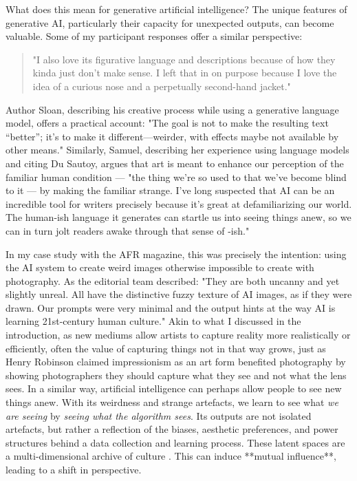 What does this mean for generative artificial intelligence? The unique features of generative AI, particularly their capacity for unexpected outputs, can become valuable. Some of my participant responses offer a similar perspective:

\begin{quote}
"I also love its figurative language and descriptions because of how they kinda just don't make sense. I left that in on purpose because I love the idea of a curious nose and a perpetually second-hand jacket."
\end{quote}

Author Sloan, describing his creative process while using a generative language model, offers a practical account: "The goal is not to make the resulting text “better”; it’s to make it different—weirder, with effects maybe not available by other means." Similarly, Samuel, describing her experience using language models and citing Du Sautoy, argues that art is meant to enhance our perception of the familiar human condition — "the thing we’re so used to that we’ve become blind to it — by making the familiar strange. I’ve long suspected that AI can be an incredible tool for writers precisely because it’s great at defamiliarizing our world. The human-ish language it generates can startle us into seeing things anew, so we can in turn jolt readers awake through that sense of -ish."

In my case study with the AFR magazine, this was precisely the intention: using the AI system to create weird images otherwise impossible to create with photography. As the editorial team described: "They are both uncanny and yet slightly unreal. All have the distinctive fuzzy texture of AI images, as if they were drawn. Our prompts were very minimal and the output hints at the way AI is learning 21st-century human culture." Akin to what I discussed in the introduction, as new mediums allow artists to capture reality more realistically or efficiently, often the value of capturing things not in that way grows, just as Henry Robinson claimed impressionism as an art form benefited photography by showing photographers they should capture what they see and not what the lens sees. In a similar way, artificial intelligence can perhaps allow people to see new things anew. With its weirdness and strange artefacts, we learn to see what \textit{we are seeing} by \textit{seeing what the algorithm sees}. Its outputs are not isolated artefacts, but rather a reflection of the biases, aesthetic preferences, and power structures behind a data collection and learning process. These latent spaces are a multi-dimensional archive of culture \cite{Schaerf2024-gf, Cetinic2022-tw, Rodriguez-Ortega2022-ak, Salvaggio2023-cv}. This can induce **mutual influence**, leading to a shift in perspective.

